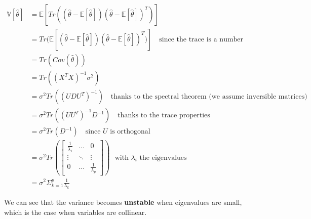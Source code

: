 \begin{align*}
\mathbb{V}[\widehat{\theta}] &= \mathbb{E}[Tr((\widehat{\theta} - \mathbb{E}[\widehat{\theta}])(\widehat{\theta} - \mathbb{E}[\widehat{\theta}])^T)] \\
	&= Tr(\mathbb{E}[(\widehat{\theta} - \mathbb{E}[\widehat{\theta}])(\widehat{\theta} - \mathbb{E}[\widehat{\theta}])^T)] ~~~ \text{ since the trace is a number} \\
	&= Tr(Cov(\widehat{\theta})) \\
	&= Tr((X^TX)^{-1}\sigma^2) \\
	&= \sigma^2Tr((UDU^T)^{-1}) ~~~ \text{ thanks to the spectral theorem (we assume inversible matrices)} \\
	&= \sigma^2Tr((UU^T)^{-1}D^{-1}) ~~~ \text{ thanks to the trace properties} \\
	&= \sigma^2Tr(D^{-1}) ~~~ \text{ since $U$ is orthogonal} \\
	&= \sigma^2Tr(\begin{bmatrix}\frac{1}{\lambda_1} & \dots & 0 \\ \vdots & \ddots & \vdots \\ 0 & \dots & \frac{1}{\lambda_p}\end{bmatrix})~~~ \text{with $\lambda_i$ the eigenvalues}  \\
	&= \sigma^2\Sigma_{k=1}^p \frac{1}{\lambda_k}
\end{align*}

We can see that the variance becomes \textbf{unstable} when eigenvalues are small, which is the case when variables are collinear.

\vspace{5mm}
